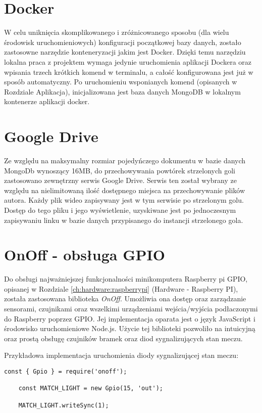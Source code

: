 \label{section:docker}
\section{Docker}
W celu uniknięcia skomplikowanego i zróżnicowanego sposobu (dla wielu środowisk uruchomieniowych) konfiguracji początkowej bazy danych, zostało zastosowne narzędzie konteneryzacji jakim jest Docker. Dzięki temu narzędziu lokalna praca z projektem wymaga jedynie uruchomienia aplikacji Dockera oraz wpisania trzech krótkich komend w terminalu, a całość konfigurowana jest już w sposób automatyczny. Po uruchomieniu wsponianych komend (opisanych w Rozdziale Aplikacja), inicjalizowana jest baza danych MongoDB w lokalnym kontenerze aplikacji docker.

\label{section:googleDrive}
\section{Google Drive}
Ze względu na maksymalny rozmiar pojedyńczego dokumentu w bazie danych MongoDb wynoszący 16MB, do przechowywania powtórek strzelonych goli zastosowano zewnętrzny serwis Google Drive. Serwis ten został wybrany ze względu na nielimitowaną ilość dostępnego miejsca na przechowywanie plików autora. Każdy plik wideo zapisywany jest w tym serwisie po strzelonym golu. Dostęp do tego pliku i jego wyświetlenie, uzyskiwane jest po jednoczesnym zapisywaniu linku w bazie danych przypisanego do instancji strzelonego gola.

\section{OnOff - obsługa GPIO}
Do obsługi najważniejszej funkcjonalności minikomputera Raspberry pi GPIO, opisanej w Rozdziale \ref{ch:hardware:raspberrypi} (Hardware - Raspberry PI), została zastosowana biblioteka \textit{OnOff}. Umożliwia ona dostęp oraz zarządzanie sensorami, czujnikami oraz wszelkimi urządzeniami wejścia/wyjścia podłaczonymi do Raspberry poprzez GPIO. Jej implementacja oparata jest o język JavaScript i środowisko uruchomieniowe Node.js. Użycie tej biblioteki pozwoliło na intuicyjną oraz prostą obsługę czujników bramek oraz diod sygnalizujących stan meczu.

Przykładowa implementacja uruchomienia diody sygnalizującej stan meczu:

\begin{lstlisting}[breaklines=true]
    const { Gpio } = require('onoff');

    const MATCH_LIGHT = new Gpio(15, 'out');

    MATCH_LIGHT.writeSync(1);
\end{lstlisting}

